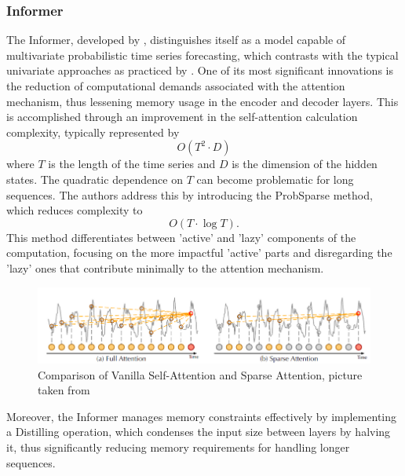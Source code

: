 \documentclass{article}
\begin{document}
\subsubsection{Informer}

The Informer, developed by \cite{Informer}, distinguishes itself as a model capable of multivariate probabilistic time series forecasting, which contrasts with the typical univariate approaches as practiced by \cite{transformer_univariate_forecasting}. One of its most significant innovations is the reduction of computational demands associated with the attention mechanism, thus lessening memory usage in the encoder and decoder layers. This is accomplished through an improvement in the self-attention calculation complexity, typically represented by
\begin{equation*}
    O(T^2 \cdot D)
\end{equation*}
where $T$ is the length of the time series and $D$ is the dimension of the hidden states. The quadratic dependence on $T$ can become problematic for long sequences. The authors address this by introducing the ProbSparse method, which reduces complexity to
\begin{equation*}
    O(T \cdot \log{T}) .
\end{equation*}
This method differentiates between 'active' and 'lazy' components of the computation, focusing on the more impactful 'active' parts and disregarding the 'lazy' ones that contribute minimally to the attention mechanism.

\begin{figure}
    \centering
    \includegraphics[width=\linewidth]{graphs/models/Sparse_Attention_Example.png}
    \caption{Comparison of Vanilla Self-Attention and Sparse Attention, picture taken from \cite{Informer}}
    \label{fig:sparse_attention}
\end{figure}

Moreover, the Informer manages memory constraints effectively by implementing a Distilling operation, which condenses the input size between layers by halving it, thus significantly reducing memory requirements for handling longer sequences.
\end{document}
